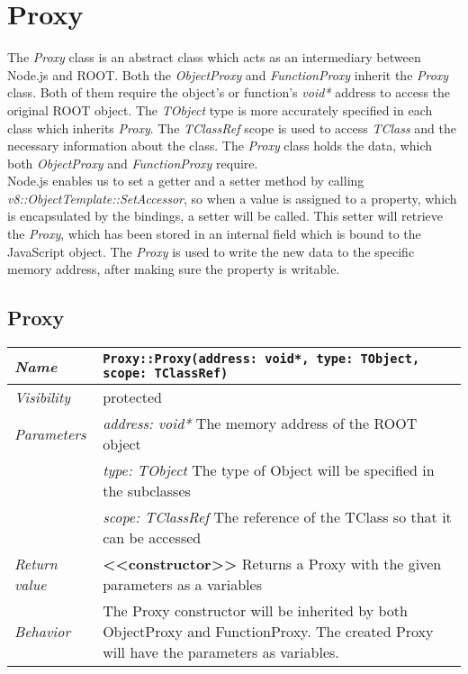 \chapter{Proxy}
The \textit{Proxy} class is an abstract class which acts as an intermediary between Node.js and ROOT. Both the
\textit{ObjectProxy} and \textit{FunctionProxy} inherit the \textit{Proxy} class. Both of them require the object's or
function's \textit{void*} address to access the original ROOT object. The \textit{TObject} type is more accurately
specified in each class which inherits \textit{Proxy}. The \textit{TClassRef} scope is used to access \textit{TClass}
and the necessary information about the class. The \textit{Proxy} class holds the data, which both
\textit{ObjectProxy} and \textit{FunctionProxy} require.\\

Node.js enables us to set a getter and a setter method by calling \textit{v8::ObjectTemplate::SetAccessor}, so when a value is assigned to a property, which is encapsulated by the bindings, a setter will be called.
This setter will retrieve the \textit{Proxy}, which has been stored in an internal field which is bound to the JavaScript object. The \textit{Proxy} is used to write the new data to the specific memory address, after making sure the property is writable.

\section{Proxy}
\begin{longtable}{p{3cm} @{\hskip 1cm} p{12cm}}
 \hline
\textit{Name} & \texttt{Proxy::Proxy(address: void*, type: TObject, scope: TClassRef)}\\
\hline
 \textit{Visibility} & protected\\
\hline
\textit{Parameters} & \textit{address: void*} The memory address of the ROOT object \\
& \textit{type: TObject}  The type of Object will be specified in the subclasses \\
& \textit{scope: TClassRef} The reference of the TClass so that it can be accessed  \\
\hline
\textit{Return value} & \textbf{<<constructor>>} Returns a Proxy with the given parameters as a variables \\
  \hline
 \textit{Behavior} & The Proxy constructor will be inherited by both ObjectProxy and FunctionProxy.
 The created Proxy will have the parameters as variables. \\
\hline
\end{longtable}
